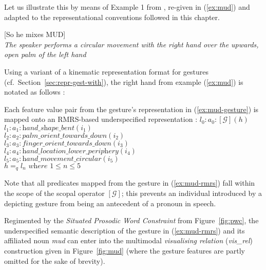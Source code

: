 \documentclass[output=paper
 	        ,biblatex
                ,babelshorthands
                ,newtxmath
                ,draftmode
                ,colorlinks, citecolor=brown
]{langscibook}
\begin{document}
Let us illustrate this by means of Example 1 from \citet[]{Alahverdzhieva:Lascarides:Flickinger:2017}, re-given in (\ref{ex:mud}) and adapted to the representational conventions followed in this chapter. 

\ea \label{ex:mud}
{[So he mixes MUD]} \\
{\textit{The speaker performs a circular movement with the right hand over the upwards, open palm of the left hand}} 
\z

Using a variant of a kinematic representation format for gestures (cf.\ Section~\ref{sec:repr-gest-with}), the right hand from example (\ref{ex:mud}) is notated as follows \citep[]{Alahverdzhieva:Lascarides:Flickinger:2017}:
%
\ea \label{ex:mud-gesture}
\z

Each feature value pair from the gesture's representation in (\ref{ex:mud-gesture}) is mapped onto an RMRS-based underspecified representation \citep[]{Alahverdzhieva:Lascarides:Flickinger:2017}:
%
\ea \label{ex:mud-rmrs}
$l_0 : a_0 : [\mathcal{G}](h)$ \\
$l_1 : a_1 : \textit{hand\_shape\_bent}(i_1)$ \\
$l_2 : a_2 : \textit{palm\_orient\_towards\_down}(i_2)$ \\
$l_3 : a_3 : \textit{finger\_orient\_towards\_down}(i_3)$ \\
$l_4 : a_4 : \textit{hand\_location\_lower\_periphery}(i_4)$ \\
$l_5 : a_5 : \textit{hand\_movement\_circular}(i_5)$ \\
$h =_q l_n \textit{ where } 1 \leq n \leq 5$
\z

Note that all predicates mapped from the gesture in (\ref{ex:mud-rmrs}) fall within the scope of the scopal operator $[\mathcal{G}]$; this prevents an individual introduced by a depicting gesture from being an antecedent of a pronoun in speech.

Regimented by the \emph{Situated Prosodic Word Constraint} from Figure~\ref{fig:pwc}, the underspecified semantic description of the gesture in (\ref{ex:mud-rmrs}) and its affiliated noun \textit{mud} can enter into the multimodal \emph{visualising relation} (\textit{vis\_rel}) construction given in Figure~\ref{fig:mud} (where the gesture features are partly omitted for the sake of brevity).
\end{document}
